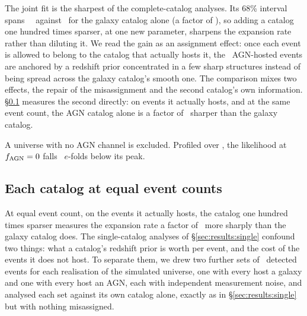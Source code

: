 The joint fit is the sharpest of the complete-catalog analyses.
Its 68\% interval spans \HzeroJointWidth~\kmsmpc\ against \HzeroGalWidth\ for
the galaxy catalog alone (a factor of \HzeroWidthRatio), so adding a
catalog one hundred times sparser, at one new parameter,
sharpens the expansion rate rather than diluting it. We read the gain as an
assignment effect: once each event is allowed to belong to the catalog that
actually hosts it, the \EvNhostAgn\ AGN-hosted events are anchored by a
redshift prior concentrated in a few sharp structures instead of being spread
across the galaxy catalog's smooth one. The comparison mixes two effects,
the repair of the misassignment and the second catalog's own information.
\S\ref{sec:results:pure} measures the second directly: on events it
actually hosts, and at the same event count, the AGN catalog alone is a
factor of \PureWidthRatio\ sharper than the galaxy catalog.

A universe with no AGN channel is excluded. Profiled over \Hz, the likelihood
at $f_{\rm AGN} = 0$ falls \FagnZeroDlnL\ $e$-folds below its peak.

\subsection{Each catalog at equal event counts}
\label{sec:results:pure}

At equal event count, on the events it actually hosts, the catalog one hundred
times sparser measures the expansion rate a factor of \PureWidthRatio\ more
sharply than the galaxy catalog does. The single-catalog analyses of
\S\ref{sec:results:single} confound two things: what a catalog's redshift
prior is worth per event, and the cost of the events it does not host. To
separate them, we drew two further sets of \PureNevents\ detected events for
each realisation of the simulated universe, one with every host a galaxy and
one with every host an AGN, each with independent measurement noise, and
analysed each set against its own catalog alone, exactly as in
\S\ref{sec:results:single} but with nothing misassigned.

